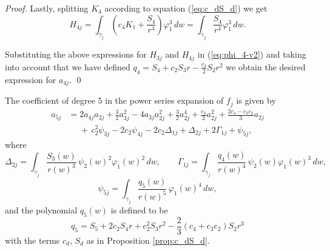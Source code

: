 \begin{proof}
Lastly, splitting $K_4$ according to equation (\ref{eq:c_dS_d}) we get
\[ H_{4j}=\int_{\gamma_j}\left(c_4K_1+\frac{S_4}{r^4}\right)\varphi_1^3\,dw=\int_{\gamma_j}\frac{S_4}{r^4}\varphi_1^3\,dw. \]

Substituting the above expressions for $H_{3j}$ and $H_{4j}$ in (\ref{eq:phi_4-v2}) and taking into account that we have defined $q_4=S_4+c_2S_3r-\frac{c_3}{2}S_2r^2$ we obtain the desired expression for $a_{4j}$. \qed
\end{proof}





\begin{proposition}\label{prop:fifthvar}
The coefficient of degree $5$ in the power series expansion of $f_j$ is given by
\begin{align*}
a_{5j}	&= 2a_{4j}a_{2j}+\frac{3}{2}a_{3j}^2-4a_{3j}a_{2j}^2+\frac{3}{2}a_{2j}^4+ \frac{c_3}{2}a_{2j}^2+\frac{2c_4-c_3c_2}{3}a_{2j} \\
	&\phantom{=} +\,c_2^2\psi_{3j}-2c_2\psi_{4j}-2c_2\Delta_{1j}+\Delta_{2j}+2\Gamma_{1j}+\psi_{5j}, 
\end{align*}
where 
\[ \Delta_{2j} = \int_{\gamma_j}\frac{S_3(w)}{r(w)^3}\,\psi_2(w)^2\varphi_1(w)^2\,dw, \qquad \Gamma_{1j} = \int_{\gamma_j}\frac{q_4(w)}{r(w)^4}\,\psi_2(w)\varphi_1(w)^3\,dw, \]
\[\psi_{5j} = \int_{\gamma_j}\frac{q_5(w)}{r(w)^5}\,\varphi_1(w)^4\,dw, \]
and the polynomial $q_5(w)$ is defined to be
\[ q_5=S_5+2c_2S_4r+c_2^2S_3r^2-\frac{2}{3}(c_4+c_3c_2)S_2r^3  \]
with the terms $c_d$, $S_d$ as in Proposition \textnormal{\ref{prop:c_dS_d}}.
\end{proposition}

